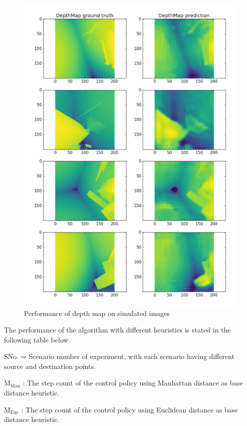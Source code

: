 \begin{figure}
  \includegraphics[width=\linewidth]{images/depthmap2.png}
  \caption{Performance of depth map on simulated images}
  \label{fig:depthmap2}
\end{figure}

The performance of the algorithm with different heuristics is stated in the following table below.
 
$ \mathrm{S No.} $ = Scenario number of experiment, with each scenario having different source and destination points.

$ \mathrm{M}_\mathrm{Man} $ : The step count of the control policy using Manhattan distance as base distance heuristic.
 
$ \mathrm{M}_\mathrm{Euc} $ : The step count of the control policy using Euclidean distance as base distance heuristic.
 

